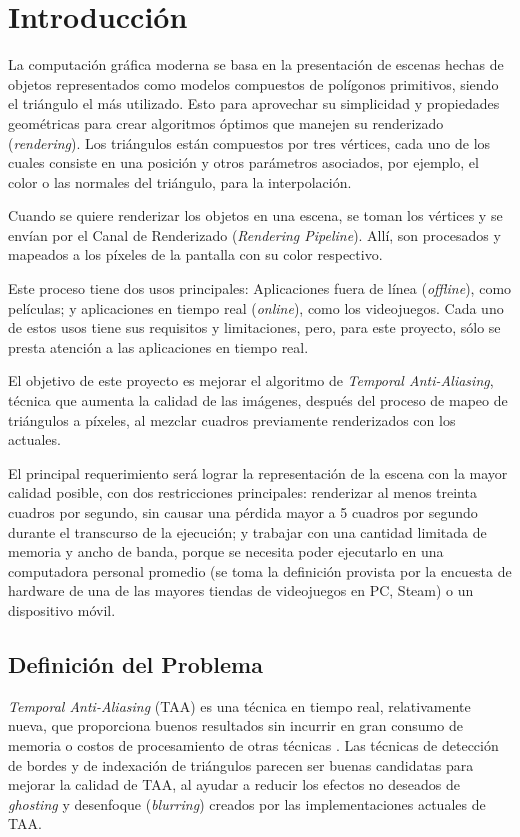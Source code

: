 \documentclass[pregrado]{tesis-usb} %
\begin{document}
\mainmatter

\chapter[Introducción]{Introducción}
La computación gráfica moderna se basa en la presentación de escenas hechas de objetos representados como modelos compuestos de polígonos primitivos, siendo el triángulo el más utilizado. Esto para aprovechar su simplicidad y propiedades geométricas para crear algoritmos óptimos que manejen su renderizado (\textit{rendering}). Los triángulos están compuestos por tres vértices, cada uno de los cuales consiste en una posición y otros parámetros asociados, por ejemplo, el color o las normales del triángulo, para la interpolación.

Cuando se quiere renderizar los objetos en una escena, se toman los vértices y se envían por el Canal de Renderizado (\textit{Rendering Pipeline}). Allí, son procesados y mapeados a los píxeles de la pantalla con su color respectivo.

Este proceso tiene dos usos principales: Aplicaciones fuera de línea (\textit{offline}), como películas; y aplicaciones en tiempo real (\textit{online}), como los videojuegos. Cada uno de estos usos tiene sus requisitos y limitaciones, pero, para este proyecto, sólo se presta atención a las aplicaciones en tiempo real.

El objetivo de este proyecto es mejorar el algoritmo de \textit{Temporal Anti-Aliasing}, técnica que aumenta la calidad de las imágenes, después del proceso de mapeo de triángulos a píxeles, al mezclar cuadros previamente renderizados con los actuales.

El principal requerimiento será lograr la representación de la escena con la mayor calidad posible, con dos restricciones principales: renderizar al menos treinta cuadros por segundo, sin causar una pérdida mayor a 5 cuadros por segundo durante el transcurso de la ejecución; y trabajar con una cantidad limitada de memoria y ancho de banda, porque se necesita poder ejecutarlo en una computadora personal promedio (se toma la definición provista por la encuesta de hardware de una de las mayores tiendas de videojuegos en PC, Steam) \cite{valvecorporation2018} o un dispositivo móvil. \cite{Doggett2017EDAN35, Shreiner2011} 


\section{Definición del Problema}
\textit{Temporal Anti-Aliasing} (TAA) es una técnica en tiempo real, relativamente nueva, que proporciona buenos resultados sin incurrir en gran consumo de memoria o costos de procesamiento de otras técnicas \cite{Doggett2017EDAN35}. Las técnicas de detección de bordes y de indexación de triángulos parecen ser buenas candidatas para mejorar la calidad de TAA, al ayudar a reducir los efectos no deseados de \textit{ghosting} y desenfoque (\textit{blurring}) creados por las implementaciones actuales de TAA.
\end{document}
